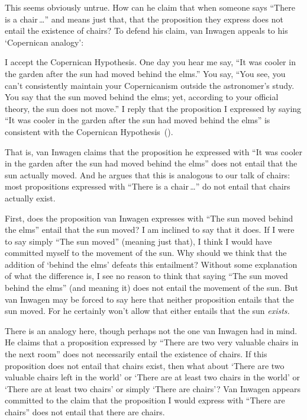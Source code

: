 \documentclass[11pt]{standalone}
\newenvironment{squote}{%
\begin{spacing}{1}
       	\begin{list}{}{%
\setlength{\labelwidth}{0pt}%
\rightmargin\leftmargin%
}
\item\relax
}{%
\end{list}%
\end{spacing}
}
\begin{document}
\begin{spacing}{1.5}
This seems obviously untrue.  How can he claim that when someone says
``There is a chair\,\ldots '' and means just that, that the
proposition they express does not entail the existence of chairs?  To
defend his claim, van Inwagen appeals to his `Copernican analogy':
\begin{squote}
I accept the Copernican Hypothesis.  One day you hear me say, ``It was
cooler in the garden after the sun had moved behind the elms.''  You
say, ``You see, you can't consistently maintain your Copernicanism
outside the astronomer's study.  You say that the sun moved behind the
elms; yet, according to your official theory, the sun does not move.''
I reply that the proposition I expressed by saying ``It was cooler in
the garden after the sun had moved behind the elms'' is consistent
with the Copernican Hypothesis~(\citeyear[101]{inwagen1995}).
\end{squote}
That is, van Inwagen claims that the proposition he expressed with
``It was cooler in the garden after the sun had moved behind the
elms'' does not entail that the sun actually moved.  And he argues
that this is analogous to our talk of chairs: most propositions
expressed with ``There is a chair\,\ldots '' do not entail that chairs
actually exist.

First, does the proposition van Inwagen expresses with ``The sun moved
behind the elms'' entail that the sun moved? I am inclined to say that
it does.  If I were to say simply ``The sun moved'' (meaning just
that), I think I would have committed myself to the movement of the
sun.  Why should we think that the addition of `behind the elms'
defeats this entailment?  Without some explanation of what the
difference is, I see no reason to think that saying ``The sun moved
behind the elms'' (and meaning it) does not entail the movement of the
sun.  But van Inwagen may be forced to say here that neither
proposition entails that the sun moved.  For he certainly won't allow
that either entails that the sun {\em exists.}

There is an analogy here, though perhaps not the one van Inwagen had
in mind.  He claims that a proposition expressed by ``There are two
very valuable chairs in the next room'' does not necessarily entail
the existence of chairs.  If this proposition does not entail that
chairs exist, then what about `There are two valuable chairs left in
the world' or `There are at least two chairs in the world' or `There
are at least two chairs' or simply `There are chairs'?  Van Inwagen
appears committed to the claim that the proposition I would express
with ``There are chairs'' does not entail that there are chairs.


\end{spacing}
\end{document}
